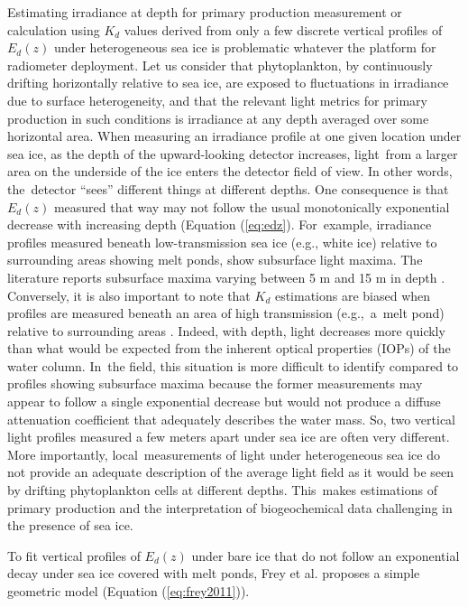 \documentclass[applsci,article,accept,moreauthors,pdftex,10pt,a4paper]{Definitions/mdpi}
\newcommand{\ked}{\ensuremath{K_{d}}}
\newcommand{\edz}{\ensuremath{{E_d(z)}}}
\begin{document}
Estimating irradiance at depth for primary production measurement or calculation using \ked{} values derived from only a few discrete vertical profiles of \edz{} under heterogeneous sea ice is problematic whatever the platform for radiometer deployment. Let us consider that phytoplankton, by continuously drifting horizontally relative to sea ice, are exposed to fluctuations in irradiance due to surface heterogeneity, and that the relevant light metrics for primary production in such conditions is irradiance at any depth averaged over some horizontal area. When measuring an irradiance profile at one given location under sea ice, as the depth of the upward-looking detector increases, light~from a larger area on the underside of the ice enters the detector field of view. In other words, the~detector ``sees'' different things at different depths. One consequence is that \edz{} measured that way may not follow the usual monotonically exponential decrease with increasing depth (Equation (\ref{eq:edz}). For~example, irradiance profiles measured beneath low-transmission sea ice (e.g., white ice) relative to surrounding areas showing melt ponds, show subsurface light maxima. The literature reports subsurface maxima varying between 5 m and 15 m in depth \citep{Frey2011, Katlein2016, Laney2017}. Conversely, it is also important to note that \ked{} estimations are biased when profiles are measured beneath an area of high transmission (e.g.,~a~melt pond) relative to surrounding areas \citep{Katlein2016}. Indeed, with depth, light decreases more quickly than what would be expected from the inherent optical properties (IOPs) of the water column. In~the field, this situation is more difficult to identify compared to profiles showing subsurface maxima because the former measurements may appear to follow a single exponential decrease but would not produce a diffuse attenuation coefficient that adequately describes the water mass. So, two vertical light profiles measured a few meters apart under sea ice are often very different. More importantly, local~measurements of light under heterogeneous sea ice do not provide an adequate description of the average light field as it would be seen by drifting phytoplankton cells at different depths. This~makes estimations of primary production and the interpretation of biogeochemical data challenging in the presence of sea ice.

To fit vertical profiles of \edz{} under bare ice that do not follow an exponential decay under sea ice covered with melt ponds, Frey et al. \cite{Frey2011} proposes a simple geometric model (Equation (\ref{eq:frey2011})). 
\end{document}

